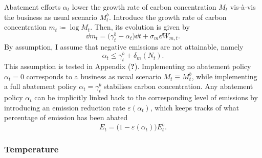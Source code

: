 \documentclass[../../main.tex]{subfiles}
\begin{document}
Abatement efforts $\alpha_t$ lower the growth rate of carbon concentration $M_t$ vis-à-vis the business as usual scenario $M^b_t$. Introduce the growth rate of carbon concentration $m_t \coloneqq  \log M_t$. Then, its evolution is given by \begin{equation} \label{eq:dynamics:carbon-concentration}
    \dd{m}_t = \big(\gamma^b_t - \alpha_t \big) \dd{t} + \sigma_m \dd{W}_{m, t}.
\end{equation} By assumption, I assume that negative emissions are not attainable, namely \begin{equation}
    \alpha_t \leq \gamma^b_t + \delta_m(N_t).
\end{equation} This assumption is tested in Appendix (\textbf{?}). \iffalse TODO: talk about this assumption further. \fi Implementing no abatement policy $\alpha_t = 0$ corresponds to a business as usual scenario $M_t \equiv M^b_t$, while implementing a full abatement policy $\alpha_t = \gamma^b_t$ stabilises carbon concentration. Any abatement policy $\alpha_t$ can be implicitly linked back to the corresponding level of emissions by introducing an emission reduction rate $\varepsilon(\alpha_t)$, which keeps tracks of what percentage of emission has been abated \begin{equation}
    E_t = \big(1 - \varepsilon(\alpha_t)\big) E^b_t.
\end{equation}

\subsubsection{Temperature}
\end{document}
